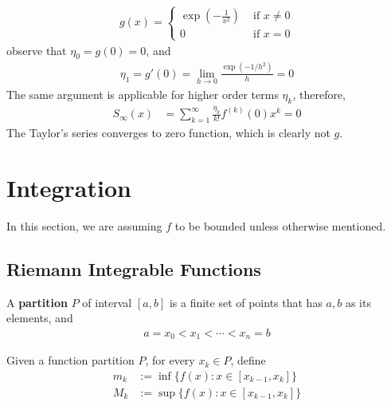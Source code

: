 \documentclass[11pt]{article}
\begin{document}
	\begin{example}
		\begin{align}
			g(x)=\left\{\begin{array}{ll}{\operatorname{exp}\left(-\frac{1}{x^{2}}\right)} & {\text { if } x \neq 0} \\ {0} & {\text { if } x=0}\end{array}\right.
		\end{align}
		observe that $\eta_0 = g(0) = 0$, and
		\begin{align}
			\eta_1 = g'(0) = \lim_{h \to 0} \frac{\exp (-1/h^2)}{h} = 0
		\end{align}
		The same argument is applicable for higher order terms $\eta_k$, therefore, 
		\begin{align}
			S_\infty(x) &= \sum_{k=1}^\infty \frac{\eta_k}{k!} f^{(k)}(0)x^k = 0
		\end{align}
		The Taylor's series converges to zero function, which is clearly not $g$.
	\end{example}
	
	\section{Integration}

	\begin{remark}
		In this section, we are assuming $f$ to be bounded unless otherwise mentioned.
	\end{remark}
	
	\subsection{Riemann Integrable Functions}
	\begin{definition}
		A \textbf{partition} $P$ of interval $[a, b]$ is a finite set of points that has $a, b$ as its elements, and 
		\begin{align}
			a = x_0 < x_1 < \cdots < x_n = b
		\end{align}
	\end{definition}
	
	\begin{notation}
		Given a function partition $P$, for every $x_k \in P$, define
		\begin{align}
			m_k &:= \inf \{f(x): x \in [x_{k-1}, x_k]\} \\
			M_k &:= \sup \{f(x): x \in [x_{k-1}, x_k]\}
		\end{align}
	\end{notation}
	
\end{document}

